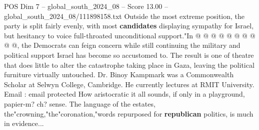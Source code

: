 \begin{textsample}{POS Dim 7 – global\_south\_2024\_08 – Score 13.00 – global\_south\_2024\_08/111898158.txt}
Outside the most extreme position, the party is split fairly evenly, with most \textbf{candidates} displaying sympathy for Israel, but hesitancy to voice full-throated unconditional support."In @ @ @ @ @ @ @ @ @ @, the Democrats can feign concern while still continuing the military and political support Israel has become so accustomed to.
The result is one of theatre that does little to alter the catastrophe taking place in Gaza, leaving the political furniture virtually untouched.
Dr.
Binoy Kampmark was a Commonwealth Scholar at Selwyn College, Cambridge.
He currently lectures at RMIT University.
Email : email protected How aristocratic it all sounds, if only in a playground, papier-m? ch? sense.
The language of the estates, the"crowning,"the"coronation,"words repurposed for \textbf{republican} politics, is much in evidence...

\end{textsample}
